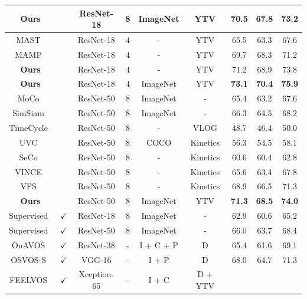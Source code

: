 \documentclass{article}
\begin{document}
\begin{table}[t]
{\begin{tabular}{ccccccccc}
      \textbf{Ours} & & ResNet-18 & 8 & ImageNet & YTV
			& \textbf{70.5} & \textbf{67.8} & \textbf{73.2} \\
      \hline
      MAST~\cite{lai2020mast} & & ResNet-18 & 4 & - & YTV
			& 65.5 & 63.3  & 67.6  \\
      MAMP~\cite{miao2021self} & & ResNet-18 & 4 & - & YTV
			& 69.7 & 68.3   & 71.2  \\
      \textbf{Ours} & & ResNet-18 & 4 & - & YTV
			& 71.2  & 68.9 & 73.8 \\
      \textbf{Ours} & & ResNet-18 & 4 & ImageNet & YTV
			& \textbf{73.1} & \textbf{70.4} & \textbf{75.9} \\
			\hline
      MoCo~\cite{he2020momentum} & & ResNet-50 & 8 & ImageNet &-
			& 65.4 & 63.2  & 67.6  \\
      SimSiam~\cite{chen2021exploring} & & ResNet-50 & 8 & ImageNet &-
			& 66.3 & 64.5  & 68.2  \\
      TimeCycle~\cite{wang2019learning} & & ResNet-50 & 8 & - & VLOG
			& 48.7 & 46.4  & 50.0  \\
      UVC~\cite{li2019joint}  & & ResNet-50 & 8 & COCO & Kinetics
			& 56.3 & 54.5  & 58.1  \\
      SeCo~\cite{yao2021seco} & & ResNet-50 & 8 & - & Kinetics
			& 60.6 & 60.4  & 62.8  \\
      VINCE~\cite{gordon2020watching} & & ResNet-50 & 8 & - & Kinetics
			& 65.6 & 63.4  & 67.8  \\
      VFS~\cite{xu2021rethinking}  & & ResNet-50 & 8 & - & Kinetics
			& 68.9 & 66.5 & 71.3    \\
      \textbf{Ours} & & ResNet-50 & 8 & ImageNet & YTV
			& \textbf{71.3}  & \textbf{68.5} & \textbf{74.0}  \\
      \hline
      Supervised~\cite{he2016deep} &$\checkmark$ & ResNet-18 & 8 & ImageNet & -
			& 62.9 & 60.6  & 65.2  \\
      Supervised~\cite{he2016deep} & $\checkmark$& ResNet-50 & 8 & ImageNet &-
			& 66.0 & 63.7  & 68.4  \\
      OnAVOS~\cite{voigtlaender2017online} & $\checkmark$ & ResNet-38 & - & I + C + P & D
			& 65.4 & 61.6  & 69.1  \\
      OSVOS-S~\cite{maninis2018video}  & $\checkmark$ & VGG-16 & - & I + P & D
			& 68.0   & 64.7 & 71.3  \\
      FEELVOS~\cite{voigtlaender2019feelvos}  & $\checkmark$ & Xception-65 & - & I + C & D + YTV

\end{tabular}}
\end{table}
\end{document}
